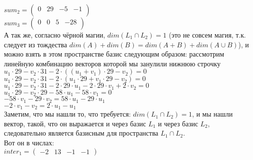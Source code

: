 \documentclass[12pt]{article}
\begin{document}
        $sum_2 = \left(\begin{array}{rrrr} 0 & 29 & -5 & -1\\\end{array}\right)$\\
        $sum_3 = \left(\begin{array}{rrrr} 0 & 0 & 5 & -28\\\end{array}\right)$\\
        А так же, согласно чёрной магии, $dim(L_1 \cap L_2) = 1$ (это не совсем магия, т.к. следует из тождества $dim(A) + dim(B) = dim(A + B) + dim(A \cup B)$), и можно взять в этом пространстве базис следующим образом: рассмотрим линейную комбинацию векторов которой мы занулили нижнюю строчку\\
        $u_1 \cdot 29 - v_2 \cdot 31 - 2 \cdot ((u_1 + v_1) \cdot 29 - v_2) = 0$\\
        $u_1 \cdot 29 - v_2 \cdot 31 - 2 \cdot (u_1 \cdot 29 + v_1 \cdot 29 - v_2) = 0$\\
        $u_1 \cdot 29 - v_2 \cdot 31 - 2 \cdot 29 \cdot u_1 - 2 \cdot 29 \cdot v_1 + 2 \cdot v_2 = 0$\\
        $u_1 \cdot 29 - v_2 \cdot 29 - 58 \cdot u_1 - 58 \cdot v_1  = 0$\\
        $-58 \cdot v_1 - 29 \cdot v_2 = 58 \cdot u_1 - 29 \cdot u_1$\\
        $-2 \cdot v_1 - v_2 = 2 \cdot u_1 - u_1$\\
        Заметим, что мы нашли то, что требуется: $dim(L_1 \cap L_2) = 1$, и мы нашли вектор, такой, что он выражается и через базис $L_1$ и через базис $L_2$, следовательно является базисным для пространства $L_1 \cap L_2$. \\
        Вот он в числах:\\
        $inter_1 = \left(\begin{array}{rrrr} -2 & 13 & -1 & -1 \end{array}\right)$\\
        
\end{document}
